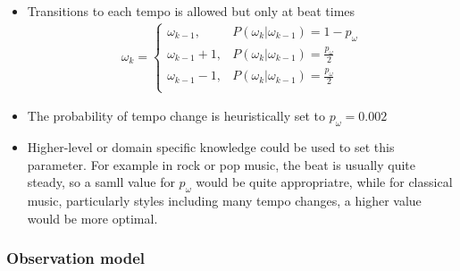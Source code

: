 \documentclass{scrartcl}
\begin{document}
\begin{itemize}
\item Transitions to each tempo is allowed but only at beat times
\begin{align}
\omega_k = 
\begin{cases}
\omega_{k-1}, & P(\omega_k|\omega_{k-1}) = 1 - p_\omega \\
\omega_{k-1}+1, & P(\omega_k|\omega_{k-1}) = \frac{p_\omega}{2} \\
\omega_{k-1}-1, & P(\omega_k|\omega_{k-1}) = \frac{p_\omega}{2} \\
\end{cases}
\end{align} 
\item The probability of tempo change is heuristically set to $p_\omega = 0.002$
\item Higher-level or domain specific knowledge could be used to set this parameter. For example in rock or pop music, the beat is usually quite steady, so a samll value for $p_\omega$ would be quite appropriatre, while for classical music, particularly styles including many tempo changes, a higher value would be more optimal.
\end{itemize}




\subsubsection{Observation model}





\end{document}
